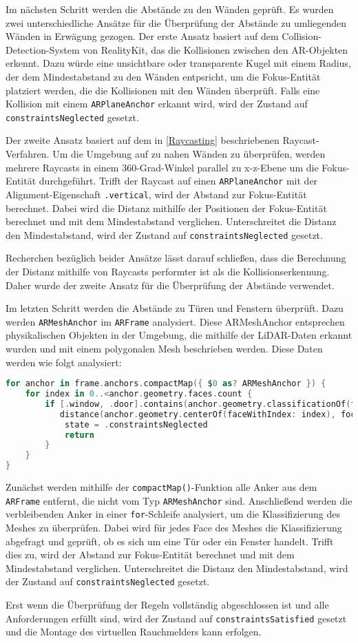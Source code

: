 Im nächsten Schritt werden die Abstände zu den Wänden geprüft. Es wurden zwei unterschiedliche Ansätze für die Überprüfung der Abstände zu umliegenden Wänden in Erwägung gezogen. Der erste Ansatz basiert auf dem Collision-Detection-System von RealityKit, das die Kollisionen zwischen den AR-Objekten erkennt. Dazu würde eine unsichtbare oder transparente Kugel mit einem Radius, der dem Mindestabstand zu den Wänden entpsricht, um die Fokus-Entität platziert werden, die die Kollisionen mit den Wänden überprüft. Falls eine Kollision mit einem \texttt{ARPlaneAnchor} erkannt wird, wird der Zustand auf \texttt{constraintsNeglected} gesetzt. 

Der zweite Ansatz basiert auf dem in \ref{Raycasting} beschriebenen Raycast-Verfahren. Um die Umgebung auf zu nahen Wänden zu überprüfen, werden mehrere Raycasts in einem 360-Grad-Winkel parallel zu x-z-Ebene um die Fokus-Entität durchgeführt. Trifft der Raycast auf einen \texttt{ARPlaneAnchor} mit der Alignment-Eigenschaft \texttt{.vertical}, wird der Abstand zur Fokus-Entität berechnet. Dabei wird die Distanz mithilfe der Positionen der Fokus-Entität berechnet und mit dem Mindestabstand verglichen. Unterschreitet die Distanz den Mindestabstand, wird der Zustand auf \texttt{constraintsNeglected} gesetzt.

Recherchen bezüglich beider Ansätze lässt darauf schließen, dass die Berechnung der Distanz mithilfe von Raycasts performter ist als die Kollisionserkennung. Daher wurde der zweite Ansatz für die Überprüfung der Abstände verwendet.

Im letzten Schritt werden die Abstände zu Türen und Fenstern überprüft. Dazu werden \texttt{ARMeshAnchor} im \texttt{ARFrame} analysiert. Diese ARMeshAnchor entsprechen physikalischen Objekten in der Umgebung, die mithilfe der LiDAR-Daten erkannt wurden und mit einem polygonalen Mesh beschrieben werden. Diese Daten werden wie folgt analysiert:

\begin{lstlisting}[language=Swift]
for anchor in frame.anchors.compactMap({ $0 as? ARMeshAnchor }) {
    for index in 0..<anchor.geometry.faces.count {
        if [.window, .door].contains(anchor.geometry.classificationOf(faceWithIndex: index)),
           distance(anchor.geometry.centerOf(faceWithIndex: index), focusEntity.position) < MountingRules.minDistanceToWindowsAndDoors {
            state = .constraintsNeglected
            return
        }
    }
}
\end{lstlisting}

Zunächst werden mithilfe der \texttt{compactMap()}-Funktion alle Anker aus dem \texttt{ARFrame} entfernt, die nicht vom Typ \texttt{ARMeshAnchor} sind. Anschließend werden die verbleibenden Anker in einer \texttt{for}-Schleife analysiert, um die Klassifizierung des Meshes zu überprüfen. Dabei wird für jedes Face des Meshes die Klassifizierung abgefragt und geprüft, ob es sich um eine Tür oder ein Fenster handelt. Trifft dies zu, wird der Abstand zur Fokus-Entität berechnet und mit dem Mindestabstand verglichen. Unterschreitet die Distanz den Mindestabstand, wird der Zustand auf \texttt{constraintsNeglected} gesetzt.

Erst wenn die Überprüfung der Regeln vollständig abgeschlossen ist und alle Anforderungen erfüllt sind, wird der Zustand auf \texttt{constraintsSatisfied} gesetzt und die Montage des virtuellen Rauchmelders kann erfolgen.
